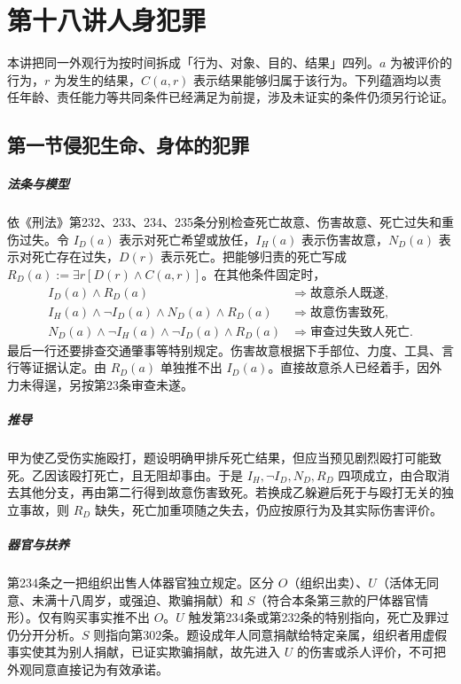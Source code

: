 \chapter{第十八讲\quad 人身犯罪}
\label{lecture:18}
\par

本讲把同一外观行为按时间拆成「行为、对象、目的、结果」四列。$a$ 为被评价的行为，$r$ 为发生的结果，$C(a,r)$ 表示结果能够归属于该行为。下列蕴涵均以责任年龄、责任能力等共同条件已经满足为前提，涉及未证实的条件仍须另行论证。

\section{第一节\quad 侵犯生命、身体的犯罪}

\paragraph{法条与模型}
依《刑法》第232、233、234、235条分别检查死亡故意、伤害故意、死亡过失和重伤过失。令 $I_D(a)$ 表示对死亡希望或放任，$I_H(a)$ 表示伤害故意，$N_D(a)$ 表示对死亡存在过失，$D(r)$ 表示死亡。把能够归责的死亡写成 $R_D(a):=\exists r[D(r)\land C(a,r)]$。在其他条件固定时，
\[
\begin{aligned}
 I_D(a)\land R_D(a)&\Longrightarrow \text{故意杀人既遂},\\
 I_H(a)\land\neg I_D(a)\land N_D(a)\land R_D(a)
   &\Longrightarrow \text{故意伤害致死},\\
 N_D(a)\land\neg I_H(a)\land\neg I_D(a)\land R_D(a)
   &\Longrightarrow \text{审查过失致人死亡}.
\end{aligned}
\]
最后一行还要排查交通肇事等特别规定。伤害故意根据下手部位、力度、工具、言行等证据认定。由 $R_D(a)$ 单独推不出 $I_D(a)$。直接故意杀人已经着手，因外力未得逞，另按第23条审查未遂。

\paragraph{推导}
甲为使乙受伤实施殴打，题设明确甲排斥死亡结果，但应当预见剧烈殴打可能致死。乙因该殴打死亡，且无阻却事由。于是 $I_H,\neg I_D,N_D,R_D$ 四项成立，由合取消去其他分支，再由第二行得到故意伤害致死。若换成乙躲避后死于与殴打无关的独立事故，则 $R_D$ 缺失，死亡加重项随之失去，仍应按原行为及其实际伤害评价。

\paragraph{器官与扶养}
第234条之一把组织出售人体器官独立规定。区分 $O$（组织出卖）、$U$（活体无同意、未满十八周岁，或强迫、欺骗捐献）和 $S$（符合本条第三款的尸体器官情形）。仅有购买事实推不出 $O$。$U$ 触发第234条或第232条的特别指向，死亡及罪过仍分开分析。$S$ 则指向第302条。题设成年人同意捐献给特定亲属，组织者用虚假事实使其为别人捐献，已证实欺骗捐献，故先进入 $U$ 的伤害或杀人评价，不可把外观同意直接记为有效承诺。

